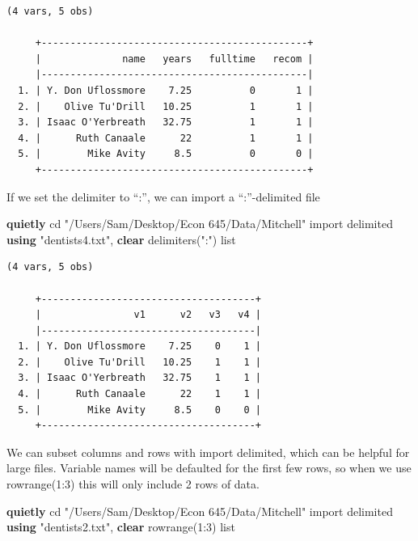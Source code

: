 \documentclass[
]{book}
\newenvironment{Shaded}{\begin{snugshade}}{\end{snugshade}}
\newcommand{\KeywordTok}[1]{\textcolor[rgb]{0.13,0.29,0.53}{\textbf{#1}}}
\newcommand{\NormalTok}[1]{#1}
\newcommand{\OtherTok}[1]{\textcolor[rgb]{0.56,0.35,0.01}{#1}}
\newcommand{\StringTok}[1]{\textcolor[rgb]{0.31,0.60,0.02}{#1}}
\begin{document}
\begin{verbatim}
(4 vars, 5 obs)

     +----------------------------------------------+
     |              name   years   fulltime   recom |
     |----------------------------------------------|
  1. | Y. Don Uflossmore    7.25          0       1 |
  2. |    Olive Tu'Drill   10.25          1       1 |
  3. | Isaac O'Yerbreath   32.75          1       1 |
  4. |      Ruth Canaale      22          1       1 |
  5. |        Mike Avity     8.5          0       0 |
     +----------------------------------------------+
\end{verbatim}

If we set the delimiter to ``:'', we can import a ``:''-delimited file

\begin{Shaded}
\begin{Highlighting}[]
\KeywordTok{quietly}\NormalTok{ cd }\StringTok{"/Users/Sam/Desktop/Econ 645/Data/Mitchell"}
\NormalTok{import delimited }\KeywordTok{using} \StringTok{"dentists4.txt"}\NormalTok{, }\KeywordTok{clear}\NormalTok{ delimiters(}\StringTok{":"}\NormalTok{) }
\OtherTok{list}
\end{Highlighting}
\end{Shaded}

\begin{verbatim}
(4 vars, 5 obs)

     +-------------------------------------+
     |                v1      v2   v3   v4 |
     |-------------------------------------|
  1. | Y. Don Uflossmore    7.25    0    1 |
  2. |    Olive Tu'Drill   10.25    1    1 |
  3. | Isaac O'Yerbreath   32.75    1    1 |
  4. |      Ruth Canaale      22    1    1 |
  5. |        Mike Avity     8.5    0    0 |
     +-------------------------------------+
\end{verbatim}

We can subset columns and rows with import delimited, which can be helpful for large files. Variable names will be defaulted for the first few rows, so when we use rowrange(1:3) this will only include 2 rows of data.

\begin{Shaded}
\begin{Highlighting}[]
\KeywordTok{quietly}\NormalTok{ cd }\StringTok{"/Users/Sam/Desktop/Econ 645/Data/Mitchell"}
\NormalTok{import delimited }\KeywordTok{using} \StringTok{"dentists2.txt"}\NormalTok{, }\KeywordTok{clear}\NormalTok{ rowrange(1:3)}
\OtherTok{list}
\end{Highlighting}
\end{Shaded}
\end{document}

